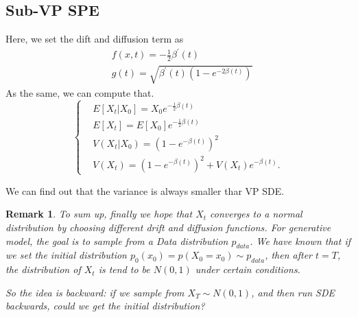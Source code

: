 \documentclass{article}
\newtheorem{remark}{Remark}
\begin{document}
\subsection{Sub-VP SPE}
Here, we set the dift and diffusion term as
\begin{equation}
\begin{aligned}
        &f(x, t)=-\frac{1}{2} \beta^{\prime}(t) \\
        &g(t)=\sqrt{\beta^{\prime}(t)\left(1-e^{-2 \beta(t)}\right)}
\end{aligned}
\end{equation}
As the same, we can compute that.
\begin{equation}
    \left\{\begin{aligned}
    &E\left[X_{t} | X_{0}\right]=X_{0} e^{-\frac{1}{2} \beta(t)} \\
    &E\left[X_{t}\right]=E\left[X_{0}\right] e^{-\frac{1}{2} \beta(t)} \\
    &V\left(X_{t} | X_{0}\right)=\left(1-e^{-\beta(t)}\right)^{2} \\
    &V\left(X_{t}\right)=\left(1-e^{-\beta(t)}\right)^{2}+V\left(X_{t}\right) e^{-\beta(t)} .
    \end{aligned}\right.
\end{equation}

We can find out that the variance is always smaller thar VP SDE.

\begin{remark}
    To sum up, finally we hope that $X_t$ converges to a normal distribution by choosing different drift and diffusion functions. 
    For generative model, the goal is to sample from a Data distribution $p_{data}$. We have known that if we set the initial distribution $p_0(x_0)=p(X_0=x_0)\sim p_{data}$, 
    then after $t=T$, the distribution of $X_t$ is tend to be $N(0, 1)$ under certain conditions. 
    
    So the idea is backward: if we sample from $X_T\sim N(0, 1)$, and then run SDE backwards, could we get the initial distribution?
\end{remark}
\end{document}
